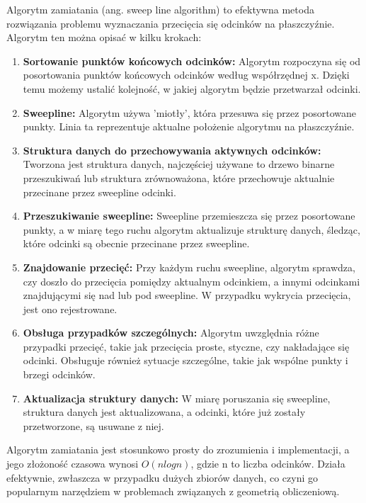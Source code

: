 \quad Algorytm zamiatania (ang. sweep line algorithm) to efektywna metoda rozwiązania problemu wyznaczania przecięcia się odcinków na płaszczyźnie. Algorytm ten można opisać w kilku krokach:


\begin{enumerate}
    \item 
    \textbf{Sortowanie punktów końcowych odcinków:}
    Algorytm rozpoczyna się od posortowania punktów końcowych odcinków według współrzędnej x. Dzięki temu możemy ustalić kolejność, w jakiej algorytm będzie przetwarzał odcinki.
    
    \item  \textbf{Sweepline:}
Algorytm używa 'miotły', która przesuwa się przez posortowane punkty. Linia ta reprezentuje aktualne położenie algorytmu na płaszczyźnie.

\item  \textbf{Struktura danych do przechowywania aktywnych odcinków:}
Tworzona jest struktura danych, najczęściej używane to drzewo binarne przeszukiwań lub struktura zrównoważona, które przechowuje aktualnie przecinane przez sweepline odcinki.

\item  \textbf{Przeszukiwanie sweepline:}
Sweepline przemieszcza się przez posortowane punkty, a w miarę tego ruchu algorytm aktualizuje strukturę danych, śledząc, które odcinki są obecnie przecinane przez sweepline.

\item  \textbf{Znajdowanie przecięć:}
Przy każdym ruchu sweepline, algorytm sprawdza, czy doszło do przecięcia pomiędzy aktualnym odcinkiem, a innymi odcinkami znajdującymi się nad lub pod sweepline. W przypadku wykrycia przecięcia, jest ono rejestrowane.

\item  \textbf{Obsługa przypadków szczególnych:}
Algorytm uwzględnia różne przypadki przecięć, takie jak przecięcia proste, styczne, czy nakładające się odcinki. Obsługuje również sytuacje szczególne, takie jak wspólne punkty i brzegi odcinków.

\item  \textbf{Aktualizacja struktury danych:}
W miarę poruszania się sweepline, struktura danych jest aktualizowana, a odcinki, które już zostały przetworzone, są usuwane z niej.

\end{enumerate}

Algorytm zamiatania jest stosunkowo prosty do zrozumienia i implementacji, a jego złożoność czasowa wynosi $O(n log n)$, gdzie n to liczba odcinków. Działa efektywnie, zwłaszcza w przypadku dużych zbiorów danych, co czyni go popularnym narzędziem w problemach związanych z geometrią obliczeniową.






